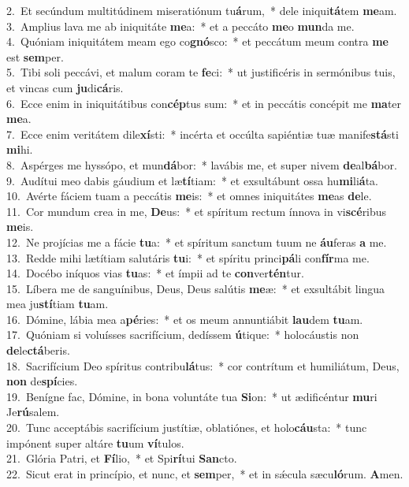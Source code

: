 {2.~}Et secúndum multitúdinem miseratiónum tu\textbf{á}rum,~* dele iniqui\textbf{tá}tem \textbf{me}am.\\
{3.~}Amplius lava me ab iniquitáte \textbf{me}a:~* et a peccáto \textbf{me}o \textbf{mun}da me.\\
{4.~}Quóniam iniquitátem meam ego co\textbf{gnó}sco:~* et peccátum meum contra \textbf{me} est \textbf{sem}per.\\
{5.~}Tibi soli peccávi, et malum coram te \textbf{fe}ci:~* ut justificéris in sermónibus tuis, et vincas cum \textbf{ju}di\textbf{cá}ris.\\
{6.~}Ecce enim in iniquitátibus con\textbf{cép}tus sum:~* et in peccátis concépit me \textbf{ma}ter \textbf{me}a.\\
{7.~}Ecce enim veritátem dile\textbf{xí}sti:~* incérta et occúlta sapiéntiæ tuæ manife\textbf{stá}sti \textbf{mi}hi.\\
{8.~}Aspérges me hyssópo, et mun\textbf{dá}bor:~* lavábis me, et super nivem \textbf{de}al\textbf{bá}bor.\\
{9.~}Audítui meo dabis gáudium et læ\textbf{tí}tiam:~* et exsultábunt ossa hu\textbf{mi}li\textbf{á}ta.\\
{10.~}Avérte fáciem tuam a peccátis \textbf{me}is:~* et omnes iniquitátes \textbf{me}as \textbf{de}le.\\
{11.~}Cor mundum crea in me, \textbf{De}us:~* et spíritum rectum ínnova in vi\textbf{scé}ribus \textbf{me}is.\\
{12.~}Ne projícias me a fácie \textbf{tu}a:~* et spíritum sanctum tuum ne \textbf{áu}feras \textbf{a} me.\\
{13.~}Redde mihi lætítiam salutáris \textbf{tu}i:~* et spíritu princi\textbf{pá}li con\textbf{fír}ma me.\\
{14.~}Docébo iníquos vias \textbf{tu}as:~* et ímpii ad te \textbf{con}ver\textbf{tén}tur.\\
{15.~}Líbera me de sanguínibus, Deus, Deus salútis \textbf{me}æ:~* et exsultábit lingua mea ju\textbf{stí}tiam \textbf{tu}am.\\
{16.~}Dómine, lábia mea a\textbf{pé}ries:~* et os meum annuntiábit \textbf{lau}dem \textbf{tu}am.\\
{17.~}Quóniam si voluísses sacrifícium, dedíssem \textbf{ú}tique:~* holocáustis non \textbf{de}le\textbf{ctá}beris.\\
{18.~}Sacrifícium Deo spíritus contribu\textbf{lá}tus:~* cor contrítum et humiliátum, Deus, \textbf{non} de\textbf{spí}cies.\\
{19.~}Benígne fac, Dómine, in bona voluntáte tua \textbf{Si}on:~* ut ædificéntur \textbf{mu}ri Je\textbf{rú}salem.\\
{20.~}Tunc acceptábis sacrifícium justítiæ, oblatiónes, et holo\textbf{cáu}sta:~* tunc impónent super altáre \textbf{tu}um \textbf{ví}tulos.\\
{21.~}Glória Patri, et \textbf{Fí}lio,~* et Spi\textbf{rí}tui \textbf{San}cto.\\
{22.~}Sicut erat in princípio, et nunc, et \textbf{sem}per,~* et in sǽcula sæcu\textbf{ló}rum. \textbf{A}men.\\
